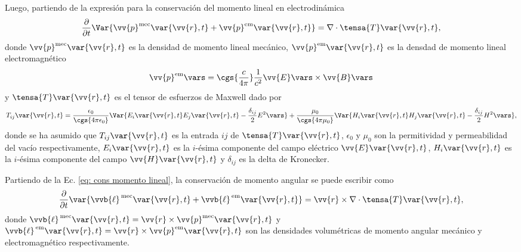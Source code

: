 Luego, partiendo de la expresión para la conservación del momento lineal en electrodinámica \cite{jackson}
\begin{equation}
\frac{\partial}{\partial t} \Var{\vv{p}^{\rm mec}\var{\vv{r},t}+\vv{p}^{\rm em}\var{\vv{r},t}} = \nabla \cdot \tensa{T}\var{\vv{r},t},
\label{eq: cons momento lineal}
\end{equation}
donde $\vv{p}^{\rm mec}\var{\vv{r},t}$ es la densidad de momento lineal mecánico, $\vv{p}^{\rm em}\var{\vv{r},t}$ es la densdad de momento lineal electromagnético
\begin{equation}
\vv{p}^{\rm em}\vars = \cgs{\frac{c}{4\pi}}\frac{1}{c^2}\vv{E}\vars\times\vv{B}\vars
\end{equation}
y $\tensa{T}\var{\vv{r},t}$ es el tensor de esfuerzos de Maxwell dado por \cite{jackson}
\begin{equation}
T_{ij}\var{\vv{r},t}= \frac{\epsilon_0}{\cgs{4\pi\epsilon_0}} \Var{E_i\var{\vv{r},t}E_j\var{\vv{r},t} -\frac{\delta_{ij}}{2}E^2\vars} +  \frac{\mu_0}{\cgs{4\pi\mu_0}} \Var{ H_i\var{\vv{r},t}H_j\var{\vv{r},t} -\frac{\delta_{ij}}{2}H^2\vars } ,
\end{equation}
donde se ha asumido que $T_{ij}\var{\vv{r},t}$ es la entrada $ij$ de $\tensa{T}\var{\vv{r},t}$, $\epsilon_0$ y $\mu_0$ son la permitividad y permeabilidad del vacío respectivamente, $E_i\var{\vv{r},t}$ es la $i$-ésima componente del campo eléctrico $\vv{E}\var{\vv{r},t}$, $H_i\var{\vv{r},t}$ es la $i$-ésima componente del campo $\vv{H}\var{\vv{r},t}$ y $\delta_{ij}$ es la delta de Kronecker. 

Partiendo de la Ec. \eqref{eq: cons momento lineal}, la conservación de momento angular se puede escribir como
\begin{equation}
\frac{\partial}{\partial t} \var{\vvb{\ell}^{\rm \, mec}\var{\vv{r},t}+\vvb{\ell}^{\rm \, em}\var{\vv{r},t}} = \vv{r}\times\nabla \cdot \tensa{T}\var{\vv{r},t},
\end{equation}
donde $\vvb{\ell}^{\rm \, mec}\var{\vv{r},t}=\vv{r}\times\vv{p}^{\rm mec}\var{\vv{r},t}$ y $\vvb{\ell}^{\rm \, em}\var{\vv{r},t}=\vv{r}\times\vv{p}^{\rm em}\var{\vv{r},t}$ son las densidades volumétricas de momento angular mecánico y electromagnético respectivamente.

